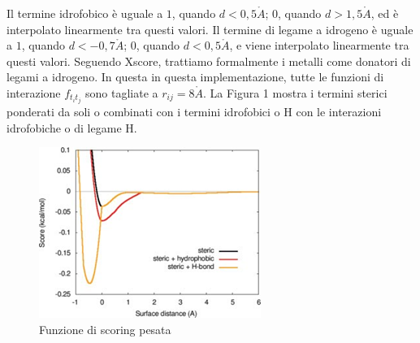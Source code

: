 Il termine idrofobico è uguale a $1$, quando $d < 0,5\mathring{A}$; $0$, quando $d > 1,5\mathring{A}$, ed è interpolato linearmente tra questi valori. Il termine di legame a idrogeno è uguale a $1$, quando $d < -0,7\mathring{A}$; $0$, quando $d < 0,5\mathring{A}$, e viene interpolato linearmente tra questi valori. Seguendo Xscore, trattiamo formalmente i metalli come donatori di legami a idrogeno. In questa in questa implementazione, tutte le funzioni di interazione $ f_{t_it_j}$ sono tagliate a $r_{ij} = 8\mathring{A}$.\newline
La Figura 1 mostra i termini sterici ponderati da soli o combinati con i termini idrofobici o H
con le interazioni idrofobiche o di legame H\cite{trott2010autodock}.

\begin{figure}[H]
    \centering
    \includegraphics{immagini/funzioneScoringPesata.png}
    \caption{Funzione di scoring pesata}
    \label{fig:Funzione di scoring pesata}
\end{figure}
